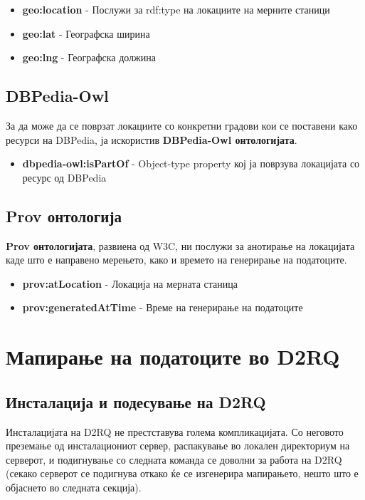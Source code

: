 \documentclass{uvamscse}
\begin{document}
\begin{itemize}
\item \textbf{geo:location} - Послужи за rdf:type на локациите на мерните станици
\item \textbf{geo:lat} - Географска ширина
\item \textbf{geo:lng} - Географска должина
\end{itemize}

\section{DBPedia-Owl}

За да може да се поврзат локациите со конкретни градови кои се поставени како ресурси на DBPedia, ја искористив \textbf{DBPedia-Owl онтологијата}.

\begin{itemize}
\item \textbf{dbpedia-owl:isPartOf} - Object-type property кој ја поврзува локацијата со ресурс од DBPedia
\end{itemize}

\section{Prov онтологија}

\textbf{Prov онтологијата}, развиена од W3C, ни послужи за анотирање на локацијата каде што е направено мерењето, како и времето на генерирање на податоците.

\begin{itemize}
\item \textbf{prov:atLocation} - Локација на мерната станица
\item \textbf{prov:generatedAtTime} - Време на генерирање на податоците
\end{itemize}

\chapter{Мапирање на податоците во D2RQ}

\section{Инсталација и подесување на D2RQ}

Инсталацијата на D2RQ не престставува голема компликацијата. Со неговото преземање од инсталациониот сервер, распакување во локален директориум на серверот, и подигнување со следната команда се доволни за работа на D2RQ (секако серверот се подигнува откако ќе се изгенерира мапирањето, нешто што е објаснето во следната секција).
\end{document}
